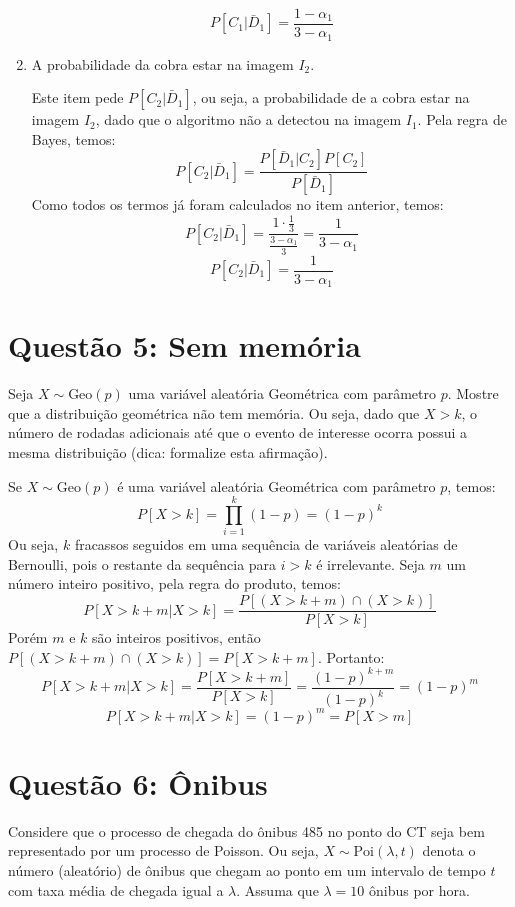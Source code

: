 \documentclass[12 pt]{article}
\begin{document}
\begin{enumerate}
\begin{tcolorbox}[colframe=black, title=Resposta:]
        $$\boxed{P[C_1 | \bar{D}_1] = \frac{1 - \alpha_1}{3 - \alpha_1}}$$
    \end{tcolorbox}
    \newpage
    \item A probabilidade da cobra estar na imagem $I_2$.
    \begin{tcolorbox}[colframe=black, title=Resposta:]
        Este item pede $P[C_2 | \bar{D}_1]$, ou seja, a probabilidade de a cobra estar na imagem $I_2$, dado que o algoritmo não a detectou na imagem $I_1$. Pela regra de Bayes, temos:
        $$
        P[C_2 | \bar{D}_1] = \frac{P[\bar{D}_1 | C_2]P[C_2]}{P[\bar{D}_1]}
        $$
        Como todos os termos já foram calculados no item anterior, temos:
        $$
        P[C_2 | \bar{D}_1] = \frac{1 \cdot \frac{1}{3}}{\frac{3 - \alpha_1}{3}} = \frac{1}{3 - \alpha_1}
        $$
        $$\boxed{P[C_2 | \bar{D}_1] = \frac{1}{3 - \alpha_1}}$$
    \end{tcolorbox}
\end{enumerate}

\section*{Questão 5: Sem memória}
Seja $X \sim \text{Geo}(p)$ uma variável aleatória Geométrica com parâmetro $p$. Mostre que a distribuição
geométrica não tem memória. Ou seja, dado que $X > k$, o número de rodadas adicionais até que o evento
de interesse ocorra possui a mesma distribuição (dica: formalize esta afirmação).
\begin{tcolorbox}[colframe=black, title=Resposta:]
Se $X \sim \text{Geo}(p)$ é uma variável aleatória Geométrica com parâmetro $p$, temos:
$$P[X > k] = \prod_{i=1}^k (1-p) = (1-p)^k$$
Ou seja, $k$ fracassos seguidos em uma sequência de variáveis aleatórias de Bernoulli, pois o restante da sequência para $i>k$ é irrelevante. Seja $m$ um número inteiro positivo, pela regra do produto, temos:
$$P[X > k + m | X > k] = \frac{P[(X > k + m) \cap (X > k)]}{P[X > k]}$$
Porém $m$ e $k$ são inteiros positivos, então $P[(X > k + m) \cap (X > k)] = P[X > k + m]$. Portanto:
$$P[X > k + m | X > k] = \frac{P[X > k + m]}{P[X > k]} = \frac{(1-p)^{k+m}}{(1-p)^k} = (1-p)^m$$ 
$$ \boxed{P[X > k + m | X > k] = (1-p)^m = P[X > m]}$$
\end{tcolorbox}

\section*{Questão 6: Ônibus}
Considere que o processo de chegada do ônibus 485 no ponto do CT seja bem representado por um
processo de Poisson. Ou seja, $X \sim \text{Poi}(\lambda, t)$ denota o número (aleatório) de ônibus que chegam ao ponto
em um intervalo de tempo $t$ com taxa média de chegada igual a $\lambda$. Assuma que $\lambda = 10$ ônibus por hora.
\end{document}
